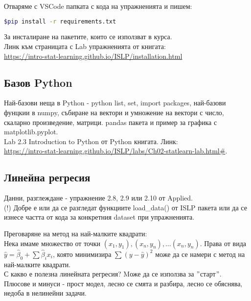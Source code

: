 \documentclass{article}
\begin{document}
 	Отваряме с VSCode папката с кода на упражненията и пишем:
	\begin{lstlisting}[language=bash]
$pip install -r requirements.txt
 	\end{lstlisting}
 	За инсталиране на пакетите, които се използват в курса. \\
 	Линк към страницата с Lab упражненията от книгата:\\
 	\href{https://intro-stat-learning.github.io/ISLP/installation.html}{https://intro-stat-learning.github.io/ISLP/installation.html}
 	
 	\subsection{Базов Python}
 	Най-базови неща в Python - python list, set, import packages, най-базови фунцкии в numpy,
 	събиране на вектори и умножение на вектори с число, скаларно произведение, матрици.
 	pandas пакета и пример за графика с matplotlib.pyplot.\\
 	
 	Lab 2.3 Introduction to Python от Python книгата. Линк: \\

 	\href{https://intro-stat-learning.github.io/ISLP/labs/Ch02-statlearn-lab.html#}{https://intro-stat-learning.github.io/ISLP/labs/Ch02-statlearn-lab.html\#}.
 	
	\subsection{Линейна регресия}
	Данни, разглеждане - упражнение 2.8, 2.9 или 2.10 от Applied. \\
	(!) Добре е или да се разгледат функциите load\_data() от ISLP пакета или
	да се изнесе частта от кода за конкретния dataset при упражненията.
	
	Преговаряне на метод на най-малките квадрати: \\
	Нека имаме множество от точки $(x_1,y_1), (x_n,y_n), \dots (x_n,y_n)$. 
	Права от вида $\hat y = \hat \beta_0 + \sum \hat \beta_i  x_i $, която минимизира $\sum (y-\hat{y})^2$  може да се намери с метод на най-малките квадрати. \\
	С какво е полезна линейната регресия? Mоже да се използва за $"$старт$"$.\\
	Плюсове и минуси - прост модел, лесно се смята и разбира, лесно се обяснява, недоба в нелинейни задачи. \\
	
\end{document}
